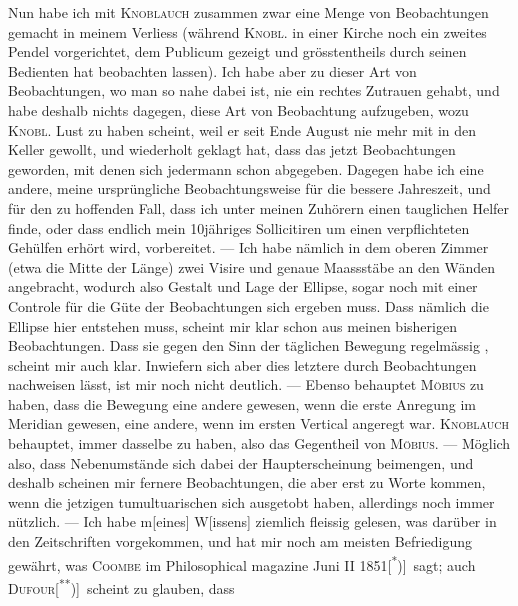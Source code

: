 Nun habe ich mit \textsc{Knoblauch} zusammen zwar eine Menge von Beobachtungen
gemacht in meinem Verliess (während \textsc{Knobl.} in einer Kirche
noch ein zweites Pendel vorgerichtet, dem Publicum gezeigt und grösstentheils
durch seinen Bedienten hat beobachten lassen). Ich habe aber zu
dieser Art von Beobachtungen, wo man so nahe dabei ist, nie ein rechtes
Zutrauen gehabt, und habe deshalb nichts dagegen, diese Art von Beobachtung
aufzugeben, wozu \textsc{Knobl.} Lust zu haben scheint, weil er seit Ende August
nie mehr mit in den Keller gewollt, und wiederholt geklagt hat, dass das
jetzt Beobachtungen geworden, mit denen sich jedermann schon abgegeben.
\clearpage{}
\noindent Dagegen habe ich eine andere, meine ursprüngliche Beobachtungsweise für
die bessere Jahreszeit, und für den zu hoffenden Fall, dass ich unter meinen
Zuhörern einen tauglichen Helfer finde, oder dass endlich mein 10jähriges
Sollicitiren um einen verpflichteten Gehülfen erhört wird, vorbereitet. — Ich
habe nämlich in dem oberen Zimmer (etwa die Mitte der Länge) zwei Visire
und genaue Maassstäbe an den Wänden angebracht, wodurch also Gestalt
und Lage der Ellipse, sogar noch mit einer Controle für die Güte der Beobachtungen
sich ergeben muss. Dass nämlich die Ellipse hier 
entstehen muss, scheint mir klar schon aus meinen bisherigen Beobachtungen.
Dass sie gegen den Sinn der täglichen Bewegung regelmässig ,
scheint mir auch klar. Inwiefern sich aber dies letztere durch Beobachtungen
nachweisen lässt, ist mir noch nicht deutlich. — Ebenso behauptet \textsc{Möbius}
 zu haben, dass die Bewegung eine andere gewesen, wenn die erste
Anregung im Meridian gewesen, eine andere, wenn im ersten Vertical angeregt
war. \textsc{Knoblauch} behauptet, immer dasselbe  zu haben, also das
Gegentheil von \textsc{Möbius}. — Möglich also, dass Nebenumstände sich dabei der
Haupterscheinung beimengen, und deshalb scheinen mir fernere Beobachtungen,
die aber erst zu Worte kommen, wenn die jetzigen tumultuarischen sich ausgetobt
haben, allerdings noch immer nützlich. — Ich habe m[eines] W[issens]
ziemlich fleissig gelesen, was darüber in den Zeitschriften vorgekommen, und
hat mir noch am meisten Befriedigung gewährt, was \textsc{Coombe} im Philosophical
magazine Juni II 1851[\textsuperscript{*})]\begingroup\renewcommand{\thefootnote}{}\endgroup\ sagt; auch \textsc{Dufour}[\textsuperscript{**})]\begingroup\renewcommand{\thefootnote}{}\endgroup\ scheint zu glauben, dass
